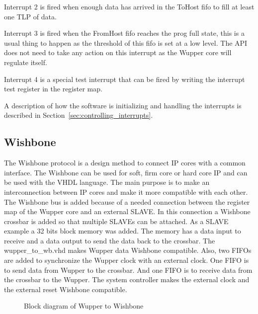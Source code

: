 Interrupt 2 is fired when enough data has arrived in the ToHost fifo to fill at least one TLP of data.

Interrupt 3 is fired when the FromHost fifo reaches the prog full state, this is a usual thing to happen as the threshold of this fifo is set at a low level. The API does not need to take any action on this interrupt as the Wupper core will regulate itself.

Interrupt 4 is a special test interrupt that can be fired by writing the interrupt test register in the register map.

A description of how the software is initializing and handling the interrupts is described in Section~\ref{sec:controlling_interrupts}.


\newpage
\subsection{Wishbone}
\begin{flushleft}
The Wishbone protocol is a design method to connect IP cores with a common interface.
The Wishbone can be used for soft, firm core or hard core IP and can be used with the VHDL language. The main purpose is to make an interconnection between IP cores and make it more compatible with each other. \newline
The Wishbone bus is added because of a needed connection between the register map of the Wupper core and an external SLAVE. In this connection a Wishbone crossbar is added so that multiple SLAVEs can be attached. As a SLAVE example a 32 bits block memory was added. The memory has a data input to receive and a data output to send the data back to the crossbar. \newline
The wupper\_to\_wb.vhd makes Wupper data Wishbone compatible. Also, two FIFOs are added to synchronize the Wupper clock  with an external clock. One FIFO is to send data from Wupper to the crossbar. And one FIFO is to receive  data from the crossbar to the Wupper. \newline
The system controller makes the external clock and the external reset Wishbone compatible.
\begin{figure}[H]
	\centering
	
	\caption{Block diagram of Wupper to Wishbone}
	\label{fig:wupper_to_wishbone}
\end{figure}
\end{flushleft}

\newpage
